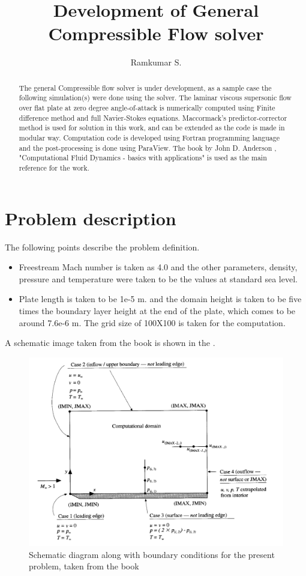 \documentclass[conf]{new-aiaa}
\title{Development of General Compressible Flow solver}
\author{Ramkumar S.}
\begin{document}
\maketitle

\begin{abstract}
    The general Compressible flow solver is under development, as a sample case
    the following simulation(s) were done using the solver.
    The laminar viscous supersonic flow over flat plate at zero degree angle-of-attack
    is numerically computed using Finite difference method and full
    Navier-Stokes equations. Maccormack's predictor-corrector method is used
    for solution in this work, and can be extended as the code is made in
    modular way. Computation code is developed using Fortran programming language
    and the post-processing is done using ParaView. The book by John D. Anderson
    , "Computational Fluid Dynamics - basics with applications" is used as the
    main reference for the work.
\end{abstract}

\section{Problem description}
The following points describe the problem definition.
\begin{itemize}
    \item Freestream Mach number is taken as 4.0 and the other parameters,
        density, pressure and temperature were taken to be the values at
        standard sea level.
    \item Plate length is taken to be 1e-5 m. and the domain height is taken to
        be five times the boundary layer height at the end of the plate, which
        comes to be around 7.6e-6 m. The grid size of 100X100 is taken for
        the computation.
\end{itemize}
A schematic image taken from the book is shown in the .

\begin{figure}[!h]
   \centering
    \includegraphics[scale=0.3]{supportingFiles/schematic_diagram.png}
    \caption{Schematic diagram along with boundary conditions for the
    present problem, taken from the book}
    \label{schematic_diagram}
\end{figure}
\end{document}

